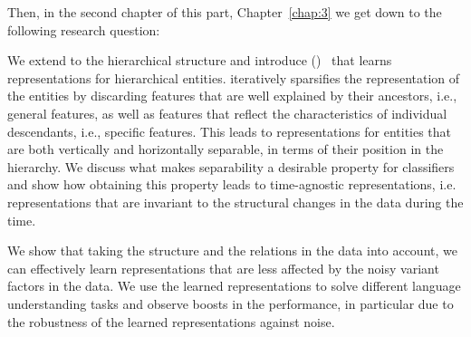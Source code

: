Then, in the second chapter of this part, Chapter~\ref{chap:3} we get down to the following research question:

We extend \emph{\swlms} to the hierarchical structure and introduce \emph{\hswlms} (\achswlm)~\citep{Dehghani:2016:ICTIR, Dehghani:2016:CLEF} that learns representations for hierarchical entities. \achswlm iteratively sparsifies the representation of the entities by discarding features that are well explained by their ancestors, i.e., general features, as well as features that reflect the characteristics of individual descendants, i.e., specific features. This leads to representations for entities that are both vertically and horizontally separable, in terms of their position in the hierarchy. We discuss what makes separability a desirable property for classifiers and show how obtaining this property leads to time-agnostic representations, i.e.  representations that are invariant to the structural changes in the data during the time.

\medskip
We show that taking the structure and the relations in the data into account, we can effectively learn representations that are less affected by the noisy variant factors in the data. We use the learned representations to solve different language understanding tasks and observe boosts in the performance, in particular due to the robustness of the learned representations against noise.



